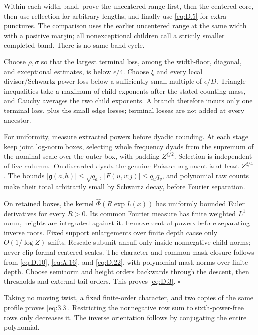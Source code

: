 \documentclass[11pt,a4paper]{article}
\begin{document}
Within each width band, prove the uncentered range first, then the centered core, then use reflection for arbitrary lengths, and finally use \eqref{eq:D.5} for extra punctures. The comparison uses the earlier uncentered range at the same width with a positive margin; all nonexceptional children call a strictly smaller completed band. There is no same-band cycle.

Choose \(\rho,\sigma\) so that the largest terminal loss, among the width-floor, diagonal, and exceptional estimates, is below \(\epsilon/4\). Choose \(\xi\) and every local divisor/Schwartz power loss below a sufficiently small multiple of \(\epsilon/D\). Triangle inequalities take a maximum of child exponents after the stated counting mass, and Cauchy averages the two child exponents. A branch therefore incurs only one terminal loss, plus the small edge losses; terminal losses are not added at every ancestor.

For uniformity, measure extracted powers before dyadic rounding. At each stage keep joint log-norm boxes, selecting whole frequency dyads from the supremum of the nominal scale over the outer box, with padding \(Z^{\xi/2}\). Selection is independent of live columns. On discarded dyads the genuine Poisson argument is at least \(Z^{\xi/4}\). The bounds \(|\mathfrak g(a,h)|\le\sqrt{q_a}\), \(|F(u,v;j)|\le q_uq_v\), and polynomial raw counts make their total arbitrarily small by Schwartz decay, before Fourier separation.

On retained boxes, the kernel \(\widehat\Phi(R\exp L(x))\) has uniformly bounded Euler derivatives for every \(R>0\). Its common Fourier measure has finite weighted \(L^1\) norm; heights are integrated against it. Remove central powers before separating inverse roots. Fixed support enlargements over finite depth cause only \(O(1/\log Z)\) shifts. Rescale subunit annuli only inside nonnegative child norms; never clip formal centered scales. The character and common-mask closure follows from \eqref{eq:D.10}, \eqref{eq:A.16}, and \eqref{eq:D.22}, with polynomial mask norms over finite depth. Choose seminorm and height orders backwards through the descent, then thresholds and external tail orders. This proves \eqref{eq:D.3}. \hfill\(\square\)

Taking no moving twist, a fixed finite-order character, and two copies of the same profile proves \eqref{eq:3.3}. Restricting the nonnegative row sum to sixth-power-free rows only decreases it. The inverse orientation follows by conjugating the entire polynomial.
\end{document}
